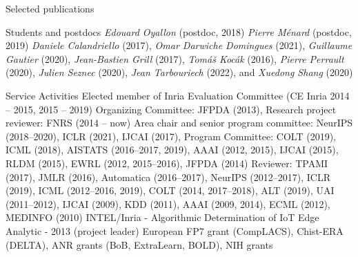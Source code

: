 \documentclass{resume}
\begin{document}
\begin{category}{Selected publications}



  

\end{category}
\vspace{-0.5cm}
\begin{category}{Students and postdocs}
\citemnobullet 
\textit{Edouard Oyallon} (postdoc, 2018)
\textit{Pierre M\'enard} (postdoc, 2019)
\textit{Daniele Calandriello} (2017), 
\textit{Omar Darwiche Domingues} (2021), 
\textit{Guillaume Gautier} (2020),
\textit{Jean-Bastien Grill} (2017), 
\textit{Tom\'a\v s Koc\' ak} (2016),
\textit{Pierre Perrault} (2020), 
\textit{Julien Seznec} (2020), 
\textit{Jean Tarbouriech} (2022), and
\textit{Xuedong Shang} (2020) 
\end{category}
\vspace{-0.5cm}
\begin{category}{Service Activities}
\setlength\itemsep{0.15em}
\citembullet Elected member of Inria Evaluation Committee (CE Inria 2014 -- 2015, 2015 -- 2019)
\citembullet Organizing Committee: JFPDA (2013),  Research project reviewer: FNRS (2014 -- now)
\citembullet Area chair and senior program committee: NeurIPS (2018--2020), ICLR (2021),  IJCAI (2017), Program Committee: COLT (2019), ICML (2018), AISTATS (2016--2017, 2019), AAAI (2012, 2015), IJCAI (2015), RLDM (2015), EWRL 
(2012, 2015--2016), JFPDA (2014)
\citembullet  Reviewer: TPAMI (2017), JMLR (2016), Automatica (2016--2017), NeurIPS (2012--2017), ICLR (2019), ICML (2012--2016, 2019), COLT
(2014, 2017--2018), ALT (2019), UAI (2011--2012), IJCAI (2009), KDD (2011), AAAI (2009, 2014), ECML
(2012), MEDINFO (2010)
\citembullet INTEL/Inria - Algorithmic Determination of IoT Edge Analytic -
2013 (project leader)
\citembullet  European FP7 grant (CompLACS), Chist-ERA (DELTA), ANR grants (BoB, ExtraLearn, BOLD), NIH grants
\end{category}
\end{document}
